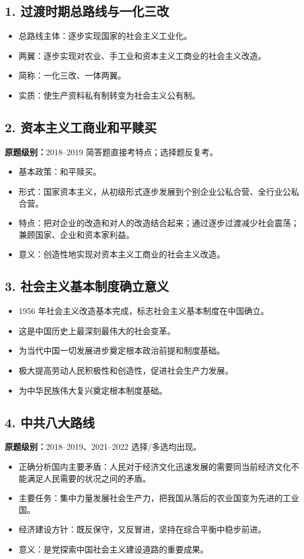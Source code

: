 \documentclass[UTF8,zihao=-4]{ctexart}
\newcommand{\exam}[1]{\textcolor{accent}{\bfseries 原题级别：}#1}
\begin{document}
\subsection{1. 过渡时期总路线与一化三改}
\begin{itemize}
  \item 总路线主体：逐步实现国家的社会主义工业化。
  \item 两翼：逐步实现对农业、手工业和资本主义工商业的社会主义改造。
  \item 简称：一化三改、一体两翼。
  \item 实质：使生产资料私有制转变为社会主义公有制。
\end{itemize}

\subsection{2. 资本主义工商业和平赎买}
\exam{2018--2019 简答题直接考特点；选择题反复考。}
\begin{itemize}
  \item 基本政策：和平赎买。
  \item 形式：国家资本主义，从初级形式逐步发展到个别企业公私合营、全行业公私合营。
  \item 特点：把对企业的改造和对人的改造结合起来；通过逐步过渡减少社会震荡；兼顾国家、企业和资本家利益。
  \item 意义：创造性地实现对资本主义工商业的社会主义改造。
\end{itemize}

\subsection{3. 社会主义基本制度确立意义}
\begin{itemize}
  \item 1956 年社会主义改造基本完成，标志社会主义基本制度在中国确立。
  \item 这是中国历史上最深刻最伟大的社会变革。
  \item 为当代中国一切发展进步奠定根本政治前提和制度基础。
  \item 极大提高劳动人民积极性和创造性，促进社会生产力发展。
  \item 为中华民族伟大复兴奠定根本制度基础。
\end{itemize}

\subsection{4. 中共八大路线}
\exam{2018--2019、2021--2022 选择/多选均出现。}
\begin{itemize}
  \item 正确分析国内主要矛盾：人民对于经济文化迅速发展的需要同当前经济文化不能满足人民需要的状况之间的矛盾。
  \item 主要任务：集中力量发展社会生产力，把我国从落后的农业国变为先进的工业国。
  \item 经济建设方针：既反保守，又反冒进，坚持在综合平衡中稳步前进。
  \item 意义：是党探索中国社会主义建设道路的重要成果。
\end{itemize}
\end{document}
